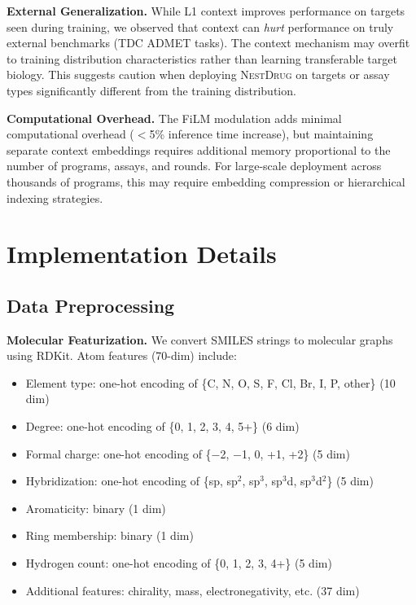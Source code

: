 \documentclass[runningheads]{llncs}
\newcommand{\methodname}{\textsc{NestDrug}}
\begin{document}
\textbf{External Generalization.}
While L1 context improves performance on targets seen during training, we observed that context can \textit{hurt} performance on truly external benchmarks (TDC ADMET tasks). The context mechanism may overfit to training distribution characteristics rather than learning transferable target biology. This suggests caution when deploying \methodname{} on targets or assay types significantly different from the training distribution.

\textbf{Computational Overhead.}
The FiLM modulation adds minimal computational overhead ($<$5\% inference time increase), but maintaining separate context embeddings requires additional memory proportional to the number of programs, assays, and rounds. For large-scale deployment across thousands of programs, this may require embedding compression or hierarchical indexing strategies.

\section{Implementation Details}
\label{app:implementation}

\subsection{Data Preprocessing}

\textbf{Molecular Featurization.} We convert SMILES strings to molecular graphs using RDKit. Atom features (70-dim) include:
\begin{itemize}[noitemsep]
    \item Element type: one-hot encoding of \{C, N, O, S, F, Cl, Br, I, P, other\} (10 dim)
    \item Degree: one-hot encoding of \{0, 1, 2, 3, 4, 5+\} (6 dim)
    \item Formal charge: one-hot encoding of \{$-$2, $-$1, 0, +1, +2\} (5 dim)
    \item Hybridization: one-hot encoding of \{sp, sp$^2$, sp$^3$, sp$^3$d, sp$^3$d$^2$\} (5 dim)
    \item Aromaticity: binary (1 dim)
    \item Ring membership: binary (1 dim)
    \item Hydrogen count: one-hot encoding of \{0, 1, 2, 3, 4+\} (5 dim)
    \item Additional features: chirality, mass, electronegativity, etc. (37 dim)
\end{itemize}
\end{document}
